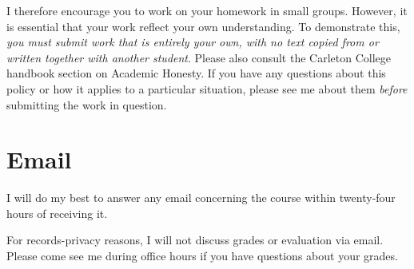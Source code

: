 \documentclass[11pt,article]{memoir}
\begin{document}
I therefore encourage you to work on your homework in small groups.
However, it is essential that your work reflect your own understanding.
To demonstrate this, \emph{you must submit work that is entirely your own, with no text copied from or written together with another student}.
Please also consult the Carleton College handbook section on Academic Honesty.
If you have any questions about this policy or how it applies to a particular situation, please see me about them \emph{before} submitting the work in question.

\section*{Email}
I will do my best to answer any email concerning the course within twenty-four hours of receiving it.

For records-privacy reasons, I will not discuss grades or evaluation via email.
Please come see me during office hours if you have questions about your grades.
\end{document}
